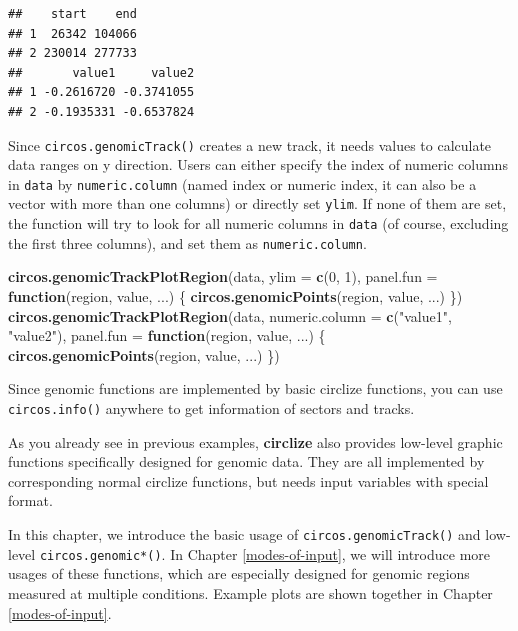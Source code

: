 \documentclass[]{book}
\newenvironment{Shaded}{\begin{snugshade}}{\end{snugshade}}
\newcommand{\KeywordTok}[1]{\textcolor[rgb]{0.13,0.29,0.53}{\textbf{#1}}}
\newcommand{\DataTypeTok}[1]{\textcolor[rgb]{0.13,0.29,0.53}{#1}}
\newcommand{\DecValTok}[1]{\textcolor[rgb]{0.00,0.00,0.81}{#1}}
\newcommand{\StringTok}[1]{\textcolor[rgb]{0.31,0.60,0.02}{#1}}
\newcommand{\ControlFlowTok}[1]{\textcolor[rgb]{0.13,0.29,0.53}{\textbf{#1}}}
\newcommand{\NormalTok}[1]{#1}
\theoremstyle{definition}
\theoremstyle{definition}
\theoremstyle{remark}
\begin{document}
\begin{verbatim}
##    start    end
## 1  26342 104066
## 2 230014 277733
##       value1     value2
## 1 -0.2616720 -0.3741055
## 2 -0.1935331 -0.6537824
\end{verbatim}

Since \texttt{circos.genomicTrack()} creates a new track, it needs
values to calculate data ranges on y direction. Users can either specify
the index of numeric columns in \texttt{data} by \texttt{numeric.column}
(named index or numeric index, it can also be a vector with more than
one columns) or directly set \texttt{ylim}. If none of them are set, the
function will try to look for all numeric columns in \texttt{data} (of
course, excluding the first three columns), and set them as
\texttt{numeric.column}.

\begin{Shaded}
\begin{Highlighting}[]
\KeywordTok{circos.genomicTrackPlotRegion}\NormalTok{(data, }\DataTypeTok{ylim =} \KeywordTok{c}\NormalTok{(}\DecValTok{0}\NormalTok{, }\DecValTok{1}\NormalTok{),}
    \DataTypeTok{panel.fun =} \ControlFlowTok{function}\NormalTok{(region, value, ...) \{}
        \KeywordTok{circos.genomicPoints}\NormalTok{(region, value, ...)}
\NormalTok{\})}
\KeywordTok{circos.genomicTrackPlotRegion}\NormalTok{(data, }\DataTypeTok{numeric.column =} \KeywordTok{c}\NormalTok{(}\StringTok{"value1"}\NormalTok{, }\StringTok{"value2"}\NormalTok{), }
    \DataTypeTok{panel.fun =} \ControlFlowTok{function}\NormalTok{(region, value, ...) \{}
        \KeywordTok{circos.genomicPoints}\NormalTok{(region, value, ...)}
\NormalTok{\})}
\end{Highlighting}
\end{Shaded}

Since genomic functions are implemented by basic circlize functions, you
can use \texttt{circos.info()} anywhere to get information of sectors
and tracks.

As you already see in previous examples, \textbf{circlize} also provides
low-level graphic functions specifically designed for genomic data. They
are all implemented by corresponding normal circlize functions, but
needs input variables with special format.

In this chapter, we introduce the basic usage of
\texttt{circos.genomicTrack()} and low-level \texttt{circos.genomic*()}.
In Chapter \ref{modes-of-input}, we will introduce more usages of these
functions, which are especially designed for genomic regions measured at
multiple conditions. Example plots are shown together in Chapter
\ref{modes-of-input}.
\end{document}
